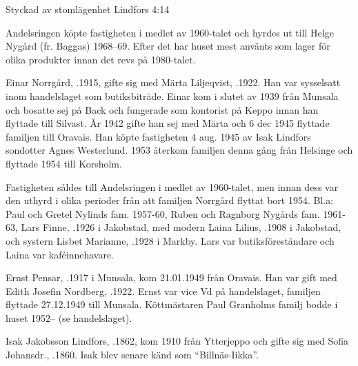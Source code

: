Styckad av stomlägenhet Lindfors 4:14

Andelsringen köpte fastigheten i medlet av 1960-talet och hyrdes ut till Helge Nygård (fr. Baggas) 1968--69. Efter det har huset mest använts som lager för olika produkter innan det revs på 1980-talet.


Einar Norrgård, .1915, gifte sig med Märta Liljeqvist, .1922. Han var sysselsatt inom handelslaget som butiksbiträde. Einar kom i slutet av 1939 från Munsala och bosatte sej på Back och fungerade som kontorist på Keppo innan han flyttade till Silvast. År 1942 gifte han sej med Märta och 6 dec 1945 flyttade familjen till Oravais. Han köpte fastigheten 4 aug. 1945 av Isak Lindfors sondotter Agnes Westerlund. 1953 återkom familjen denna gång från Helsinge och flyttade 1954 till Korsholm.
\begin{jhchildren}
  \item {}
  \item {}
  \item {}
\end{jhchildren}

Fastigheten såldes till Andelsringen i medlet av 1960-talet, men innan dess var den uthyrd i olika perioder från att familjen Norrgård flyttat bort 1954. Bl.a: Paul och Gretel Nylinds fam. 1957-60, Ruben och Ragnborg Nygårds fam. 1961-63, Lars Finne, .1926 i Jakobstad, med modern Laina Lilius, .1908 i Jakobstad, och systern Lisbet Marianne, .1928 i Markby. Lars var butiksföreståndare och Laina var kaféinnehavare.

Ernst Pensar, .1917 i Munsala, kom 21.01.1949 från Oravais. Han var gift med Edith Josefin Nordberg, .1922. Ernst var vice Vd på handelslaget, familjen flyttade 27.12.1949 till Munsala. Köttmästaren Paul Granholms familj bodde i huset 1952--  (se handelslaget).


Isak Jakobsson Lindfors, .1862, kom 1910 från Ytterjeppo och gifte sig med Sofia Johansdr., .1860. Isak blev senare känd som ``Billnäs-Iikka''.

